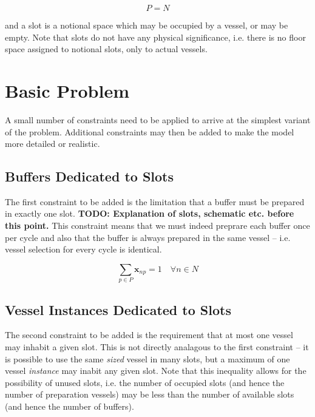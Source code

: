 \begin{equation}
    P = N
\end{equation}

and a slot is a notional space which may be occupied by a vessel, or may be
empty.
Note that slots do not have any physical significance, i.e. there is no floor
space assigned to notional slots, only to actual vessels.


\section{Basic Problem}\label{S.basicprob}

A small number of constraints need to be applied to arrive at the simplest 
variant of the problem.
Additional constraints may then be added to make the model more detailed or
realistic.

\subsection{Buffers Dedicated to Slots}\label{SS.constr1}

The first constraint to be added is the limitation that a buffer must be 
prepared in exactly one slot. 
\textbf{TODO: Explanation of slots, schematic etc. before this point.}
This constraint means that we must indeed preprare each buffer once per cycle
and also that the buffer is always prepared in the same vessel -- i.e. vessel
selection for every cycle is identical.

\begin{equation}
    \sum_{p \in P} \boldsymbol{x}_{np} = 1 \quad \forall n \in N
\end{equation}

\subsection{Vessel Instances Dedicated to Slots}\label{SS.constr2}

The second constraint to be added is the requirement that at most one vessel
may inhabit a given slot.
This is not directly analagous to the first constraint -- it is possible to 
use the same \emph{sized} vessel in many slots, but a maximum of one vessel 
\emph{instance} may inabit any given slot.
Note that this inequality allows for the possibility of unused slots, i.e. the
number of occupied slots (and hence the number of preparation vessels) may be
less than the number of available slots (and hence the number of buffers).

